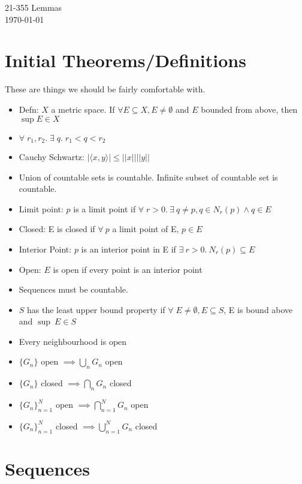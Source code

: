 \documentclass[11pt]{article}
\begin{document}
\begin{center}
  {\LARGE 21-355 Lemmas} \\
    \today
\end{center}

\section{Initial Theorems/Definitions}
These are things we should be fairly comfortable with.
\begin{itemize}
\item Defn: $X$ a metric space. If $\forall E \subseteq X, E \neq \emptyset$
  and $E$ bounded from above, then $\sup E \in X$
\item $\forall\;r_1,r_2.\; \exists\;q.\; r_1 < q < r_2$
\item Cauchy Schwartz: $|\langle x, y \rangle| \leq ||x|| ||y||$
\item Union of countable sets is countable. Infinite subset of countable set is
  countable.
\item Limit point: $p$ is a limit point if $\forall\;r > 0.~\exists~q \neq p, q
  \in N_r(p) \land q \in E$
\item Closed: E is closed if $\forall~p$ a limit point of E, $p \in E$
\item Interior Point: $p$ is an interior point in E if $\exists~r > 0.~ N_r(p)
  \subseteq E$
\item Open: $E$ is open if every point is an interior point
\item Sequences must be countable.
\item $S$ has the least upper bound property if $\forall\;E \neq \emptyset, E
  \subseteq S$, E is bound above and $\sup~E \in S$
\item Every neighbourhood is open
\item $\{ G_n \}$ open $\implies \bigcup_n G_n$ open
\item $\{ G_n \}$ closed $\implies \bigcap_n G_n$ closed
\item $\{ G_n \}_{n=1}^{N}$ open $\implies \bigcap_{n = 1}^N G_n$ open
\item $\{ G_n \}_{n=1}^{N}$ closed $\implies \bigcup_{n = 1}^N G_n$ closed
\end{itemize}

\section{Sequences} %
\end{document}
